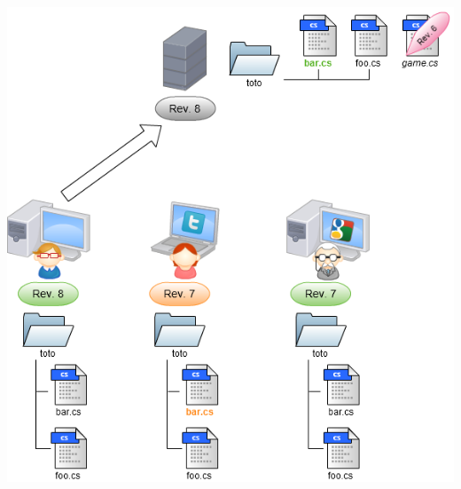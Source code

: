 \begin{frame}
  \begin{center}
    \includegraphics[scale=0.3]{images/13-Commit4.png}
  \end{center}
\end{frame}

